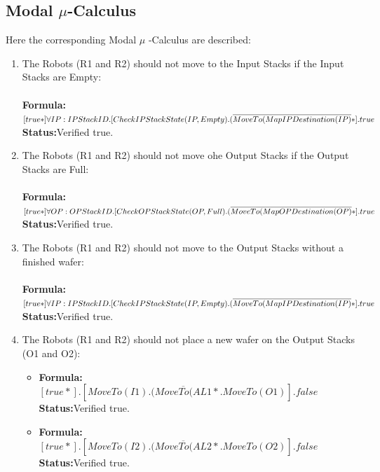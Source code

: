 \documentclass[a4paper,12pt]{article}
\begin{document}
	\subsection{Modal $\mu$-Calculus}
	Here the corresponding Modal $\mu$ -Calculus are described:
	\begin{enumerate}
		
		\item The Robots (R1 and R2) should not move to the Input Stacks if the Input Stacks are Empty:
		\\
		\\\textbf{Formula:} $[true*] \forall IP: IPStackID.[CheckIPStackState(IP, Empty).
		\\(\overline{MoveTo(MapIPDestination(IP)}*].true$ \\\textbf{Status:}Verified true.
		
		
		\item The Robots (R1 and R2) should not move ohe Output Stacks if the Output Stacks are Full:
		\\
		\\\textbf{Formula:} $[true*] \forall OP: OPStackID.[CheckOPStackState(OP, Full).
		\\(\overline{MoveTo(MapOPDestination(OP)}*].true$ \\\textbf{Status:}Verified true.
		
		
		\item The Robots (R1 and R2) should not move to the Output Stacks without a finished wafer:
		\\
		\\\textbf{Formula:} $[true*] \forall IP: IPStackID.[CheckIPStackState(IP, Empty).
		\\(\overline{MoveTo(MapIPDestination(IP)}*].true$ \\\textbf{Status:}Verified true.
		
		
		\item The Robots (R1 and R2) should not place a new wafer on the Output Stacks (O1 and O2):
		\begin{itemize}
			\item \textbf{Formula:} $[true*].[MoveTo(I1).(\overline{MoveTo(AL1}*.MoveTo(O1)].false$ \\\textbf{Status:}Verified true.
			\item \textbf{Formula:} $[true*].[MoveTo(I2).(\overline{MoveTo(AL2}*.MoveTo(O2)].false$ \\\textbf{Status:}Verified true.
		\end{itemize}
		

\end{enumerate}
\end{document}
